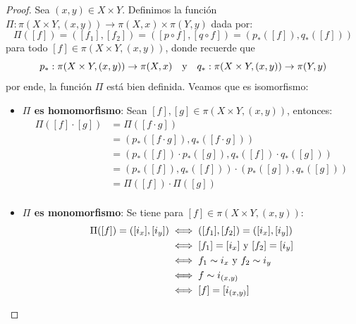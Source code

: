 \documentclass{article}
\newcounter{it}
\theoremstyle{largebreak}
\newcommand\cf[3]{\ensuremath{#1:#2\rightarrow#3}}
\begin{document}
    \begin{proof}
        Sea $(x,y)\in X\times Y$. Definimos la función $\cf{\Pi}{\pi(X\times Y,(x,y))}{\pi(X,x)\times\pi(Y,y)}$ dada por:
        \begin{equation*}
            \Pi([f])=([f_1],[f_2])=([p\circ f],[q\circ f])=(p_*([f]),q_*([f]))
        \end{equation*}
        para todo $[f]\in\pi(X\times Y,(x,y))$, donde recuerde que
        \begin{equation*}
            \cf{p_*}{\pi(X\times Y,(x,y))}{\pi(X,x)}\quad\textup{y}\quad\cf{q_*}{\pi(X\times Y,(x,y))}{\pi(Y,y)}
        \end{equation*}
        por ende, la función $\Pi$ está bien definida. Veamos que es isomorfismo:
        \begin{itemize}
            \item \textbf{$\Pi$ es homomorfismo}: Sean $[f],[g]\in\pi(X\times Y,(x,y))$, entonces:
            \begin{equation*}
                \begin{split}
                    \Pi([f]\cdot[g])&=\Pi([f\cdot g])\\
                    &=(p_*([f\cdot g]),q_*([f\cdot g]))\\
                    &=(p_*([f])\cdot p_*([g]),q_*([f])\cdot q_*([g]))\\
                    &=(p_*([f]),q_*([f]))\cdot(p_*([g]),q_*([g]))\\
                    &=\Pi([f])\cdot\Pi([g])\\
                \end{split}
            \end{equation*}
            \item \textbf{$\Pi$ es monomorfismo}: Se tiene para $[f]\in\pi(X\times Y,(x,y))$:
            \begin{equation*}
                \begin{split}
                    \Pi([f])=([i_x],[i_y])&\iff ([f_1],[f_2])=([i_x],[i_y])\\
                    &\iff [f_1]=[i_x]\textup{ y }[f_2]=[i_y]\\
                    &\iff f_1\sim i_x\textup{ y }f_2\sim i_y\\
                    &\iff f\sim i_{(x,y)}\\
                    &\iff [f]=[i_{(x,y)}]\\
                \end{split}
            \end{equation*}

\end{itemize}
\end{proof}
\end{document}
